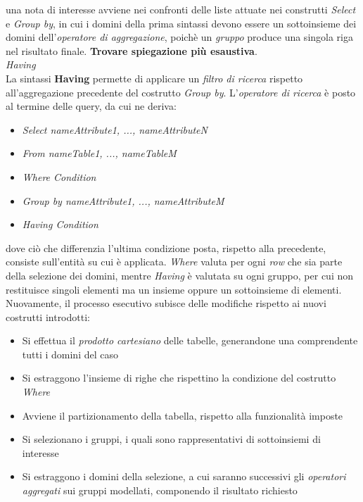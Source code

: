 \documentclass{article}
\begin{document}
una nota di interesse avviene nei confronti delle liste attuate nei construtti \textit{Select} e \textit{Group by}, in cui i domini della prima sintassi devono essere un sottoinsieme dei domini dell'\textit{operatore di aggregazione}, poichè un \textit{gruppo} produce una singola riga nel risultato finale. \textbf{Trovare spiegazione più esaustiva}.\vspace*{14pt}\\
\textit{Having}\\
La sintassi \textbf{Having} permette di applicare un \textit{filtro di ricerca} rispetto all'aggregazione precedente del costrutto \textit{Group by}. L'\textit{operatore di ricerca} è posto al termine delle query, da cui ne deriva:
\begin{itemize}[label={ }, leftmargin=1cm]
    \itemsep0em
    \item \textit{Select nameAttribute1, ..., nameAttributeN}
    \item \textit{From nameTable1, ..., nameTableM}
    \item \textit{Where Condition}
    \item \textit{Group by nameAttribute1, ..., nameAttributeM}
    \item \textit{Having Condition}
\end{itemize}
dove ciò che differenzia l'ultima condizione posta, rispetto alla precedente, consiste sull'entità su cui è applicata. \textit{Where} valuta per ogni \textit{row} che sia parte della selezione dei domini, mentre \textit{Having} è valutata su ogni gruppo, per cui non restituisce singoli elementi ma un insieme oppure un sottoinsieme di elementi.\vspace*{14pt}\\
Nuovamente, il processo esecutivo subisce delle modifiche rispetto ai nuovi costrutti introdotti:
\begin{itemize}[label={-}]
    \itemsep0em
    \item Si effettua il \textit{prodotto cartesiano} delle tabelle, generandone una comprendente tutti i domini del caso
    \item Si estraggono l'insieme di righe che rispettino la condizione del costrutto \textit{Where}
    \item Avviene il partizionamento della tabella, rispetto alla funzionalità imposte
    \item Si selezionano i gruppi, i quali sono rappresentativi di sottoinsiemi di interesse
    \item Si estraggono i domini della selezione, a cui saranno successivi gli \textit{operatori aggregati} sui gruppi modellati, componendo il risultato richiesto
\end{itemize}
\end{document}
